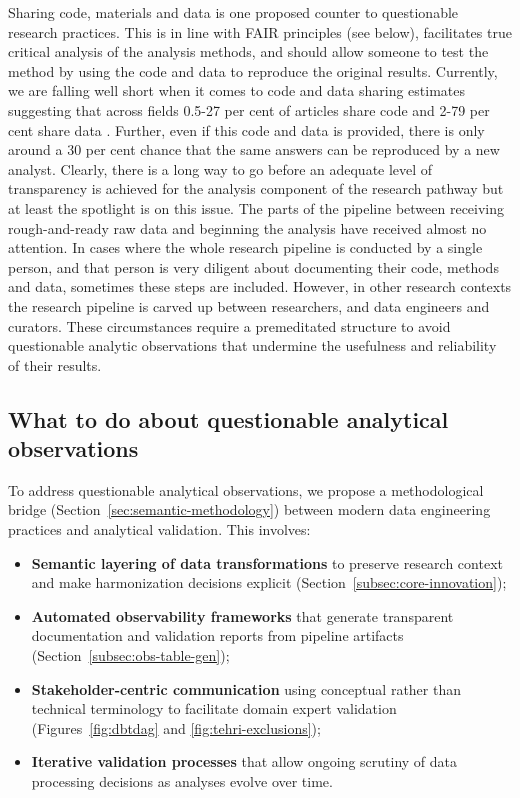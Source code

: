 \documentclass{article}
\begin{document}
Sharing code, materials and data is one proposed counter to questionable research practices. This is in line with FAIR principles (see below), facilitates true critical analysis of the analysis methods, and should allow someone to test the method by using the code and data to reproduce the original results. Currently, we are falling well short when it comes to code and data sharing estimates suggesting that across fields 0.5-27 per cent of articles share code and 2-79 per cent share data \cite{hardwicke2018data, culina2020low, stodden2018empirical, kambouris2024computationally, hamilton2023prevalence}. Further, even if this code and data is provided, there is only around a 30 per cent chance that the same answers can be reproduced by a new analyst\cite{hardwicke2018data, kambouris2024computationally}. Clearly, there is a long way to go before an adequate level of transparency is achieved for the analysis component of the research pathway but at least the spotlight is on this issue. The parts of the pipeline between receiving rough-and-ready raw data and beginning the analysis have received almost no attention. In cases where the whole research pipeline is conducted by a single person, and that person is very diligent about documenting their code, methods and data, sometimes these steps are included. However, in other research contexts the research pipeline is carved up between researchers, and data engineers and curators. These circumstances require a premeditated structure to avoid questionable analytic observations that undermine the usefulness and reliability of their results. 

\subsection{What to do about questionable analytical observations}

To address questionable analytical observations, we propose a methodological bridge (Section~\ref{sec:semantic-methodology}) between modern data engineering practices and analytical validation. This involves:
\begin{itemize}
    \item \textbf{Semantic layering of data transformations} to preserve research context and make harmonization decisions explicit (Section~\ref{subsec:core-innovation});
    \item \textbf{Automated observability frameworks} that generate transparent documentation and validation reports from pipeline artifacts (Section~\ref{subsec:obs-table-gen});
    \item \textbf{Stakeholder-centric communication} using conceptual rather than technical terminology to facilitate domain expert validation (Figures~\ref{fig:dbtdag} and \ref{fig:tehri-exclusions});
    \item \textbf{Iterative validation processes} that allow ongoing scrutiny of data processing decisions as analyses evolve over time.
\end{itemize}
\end{document}
